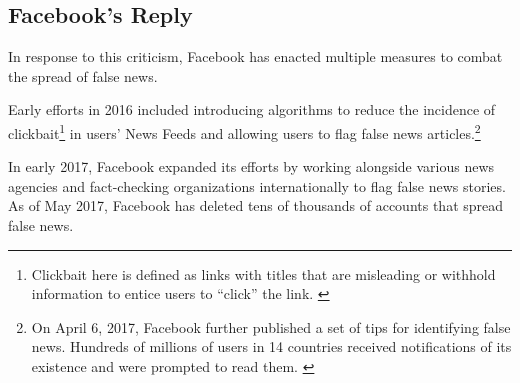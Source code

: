 \subsection{Facebook's Reply}

\par In response to this criticism, Facebook has enacted multiple measures to combat the spread of false news. \cite{fb_newsroom,fb_hoaxes_2016,guardian_tips,tc_downranks,tc_ai,telegraph_delete}

\par Early efforts in 2016 included introducing algorithms to reduce the incidence of clickbait\footnote{Clickbait here is defined as links with titles that are misleading or withhold information to entice users to ``click'' the link. \cite{fb_hoaxes_2016}} in users' News Feeds \cite{fb_hoaxes_2016} and allowing users to flag false news articles.\footnote{On April 6, 2017, Facebook further published a set of tips for identifying false news. Hundreds of millions of users in 14 countries received notifications of its existence and were prompted to read them. \cite{guardian_tips}} \cite{tc_downranks} 

\par In early 2017, Facebook expanded its efforts by working alongside various news agencies and fact-checking organizations internationally to flag false news stories. \cite{guardian_steps} As of May 2017, Facebook has deleted tens of thousands of accounts that spread false news. \cite{telegraph_delete}

\vfill